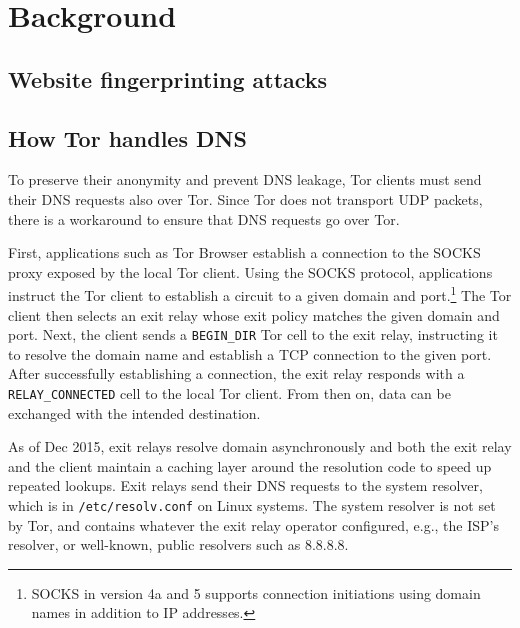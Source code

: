 \section{Background}
\label{sec:background}

\subsection{Website fingerprinting attacks}

\subsection{How Tor handles DNS}
To preserve their anonymity and prevent DNS leakage, Tor clients must send their
DNS requests also over Tor.  Since Tor does not transport UDP packets, there is
a workaround to ensure that DNS requests go over Tor.

First, applications such as Tor Browser establish a connection to the SOCKS
proxy exposed by the local Tor client.  Using the SOCKS protocol, applications
instruct the Tor client to establish a circuit to a given domain and
port.\footnote{SOCKS in version 4a and 5 supports connection initiations using
domain names in addition to IP addresses.} The Tor client then selects an exit
relay whose exit policy matches the given domain and port.  Next, the client
sends a \texttt{BEGIN\_DIR} Tor cell to the exit relay, instructing it to
resolve the domain name and establish a TCP connection to the given port.  After
successfully establishing a connection, the exit relay responds with a
\texttt{RELAY\_CONNECTED} cell to the local Tor client.  From then on, data can
be exchanged with the intended destination.

As of Dec 2015, exit relays resolve domain asynchronously and both the exit
relay and the client maintain a caching layer around the resolution code to
speed up repeated lookups.  Exit relays send their DNS requests to the system
resolver, which is in \texttt{/etc/resolv.conf} on Linux systems.  The system
resolver is not set by Tor, and contains whatever the exit relay operator
configured, e.g., the ISP's resolver, or well-known, public resolvers such as
8.8.8.8.
